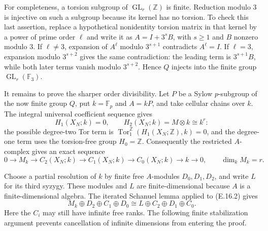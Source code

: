 For completeness, a torsion subgroup of
$\operatorname{GL}_r(\mathbb Z)$ is finite. Reduction modulo
$3$ is injective on such a subgroup because its kernel has
no torsion. To check this last assertion, replace a hypothetical
nonidentity torsion matrix in that kernel by a power of prime
order $\ell$ and write it as $A=I+3^sB$, with $s\geq1$ and
$B$ nonzero modulo $3$. If $\ell\ne3$, expansion of $A^\ell$
modulo $3^{s+1}$ contradicts $A^\ell=I$. If $\ell=3$, expansion
modulo $3^{s+2}$ gives the same contradiction: the leading
term is $3^{s+1}B$, while both later terms vanish modulo
$3^{s+2}$. Hence $Q$ injects into the finite group
$\operatorname{GL}_r(\mathbb F_3)$.

It remains to prove the sharper order divisibility. Let $P$ be
a Sylow $p$-subgroup of the now finite group $Q$, put
$k=\mathbb F_p$ and $A=kP$, and take cellular chains over $k$.
The integral universal coefficient sequence gives
\[
 H_1(X_N;k)=0,
 \qquad H_2(X_N;k)=M\otimes k\cong k^r:
\]
the possible degree-two Tor term is
$\operatorname{Tor}_1^{\mathbb Z}(H_1(X_N;\mathbb Z),k)=0$,
and the degree-one term uses the torsion-free group $H_0=\mathbb Z$.
Consequently the restricted $A$-complex gives an exact sequence
\[
 0\longrightarrow M_k\longrightarrow C_2(X_N;k)
 \longrightarrow C_1(X_N;k)\longrightarrow C_0(X_N;k)
 \longrightarrow k\longrightarrow0,
 \qquad \dim_k M_k=r.
 \tag{E.16.2}
\]

Choose a partial resolution of $k$ by finite free $A$-modules
$D_0,D_1,D_2$, and write $L$ for its third syzygy. These
modules and $L$ are finite-dimensional because $A$ is a
finite-dimensional algebra. The iterated Schanuel lemma
applied to (E.16.2) gives
\[
 M_k\oplus D_2\oplus C_1\oplus D_0
 \cong L\oplus C_2\oplus D_1\oplus C_0.
 \tag{E.16.3}
\]
Here the $C_i$ may still have infinite free ranks. The following
finite stabilization argument prevents cancellation of infinite
dimensions from entering the proof.

